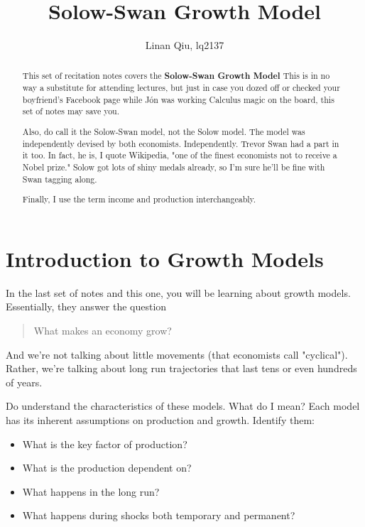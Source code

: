 \documentclass[11pt]{scrartcl}
\title{Solow-Swan Growth Model}
\author{Linan Qiu, lq2137}
\newcommand{\jon}{J\'{o}n }
\begin{document}
\maketitle

\begin{abstract}
This set of recitation notes covers the \textbf{Solow-Swan Growth Model } This is in no way a substitute for attending lectures, but just in case you dozed off or checked your boyfriend's Facebook page while \jon was working Calculus magic on the board, this set of notes may save you.

Also, do call it the Solow-Swan model, not the Solow model. The model was independently devised by both economists. Independently. Trevor Swan had a part in it too. In fact, he is, I quote Wikipedia, "one of the finest economists not to receive a Nobel prize." Solow got lots of shiny medals already, so I'm sure he'll be fine with Swan tagging along.

Finally, I use the term income and production interchangeably. 
\end{abstract}

\section{Introduction to Growth Models}

In the last set of notes and this one, you will be learning about growth models. Essentially, they answer the question

\begin{quote}
What makes an economy grow?
\end{quote}

And we're not talking about little movements (that economists call "cyclical"). Rather, we're talking about long run trajectories that last tens or even hundreds of years.

Do understand the characteristics of these models. What do I mean? Each model has its inherent assumptions on production and growth. Identify them:

\begin{itemize}
\item What is the key factor of production?
\item What is the production dependent on?
\item What happens in the long run?
\item What happens during shocks both temporary and permanent?
\end{itemize}
\end{document}
